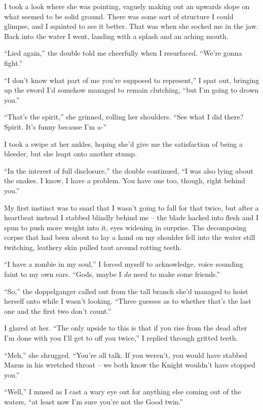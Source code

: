 \documentclass[12pt, openany]{book}
\begin{document}
I took a look where she was pointing, vaguely making out an upwards slope on what seemed to be solid ground. There was some sort of structure I could glimpse, and I squinted to see it better. That was when she socked me in the jaw. Back into the water I went, landing with a splash and an aching mouth.

“Lied again,” the double told me cheerfully when I resurfaced. “We’re gonna fight.”

“I don’t know what part of me you’re supposed to represent,” I spat out, bringing up the sword I’d somehow managed to remain clutching, “but I’m going to drown you.”

“That’s the spirit,” she grinned, rolling her shoulders. “See what I did there? Spirit. It’s funny because I’m a-”

I took a swipe at her ankles, hoping she’d give me the satisfaction of being a bleeder, but she leapt onto another stump.

“In the interest of full disclosure,” the double continued, “I was also lying about the snakes. I know, I have a problem. You have one too, though, right behind you.”

My first instinct was to snarl that I wasn’t going to fall for that twice, but after a heartbeat instead I stabbed blindly behind me – the blade hacked into flesh and I spun to push more weight into it, eyes widening in surprise. The decomposing corpse that had been about to lay a hand on my shoulder fell into the water still twitching, leathery skin pulled taut around rotting teeth.

“I have a zombie in my soul,” I forced myself to acknowledge, voice sounding faint to my own ears. “Gods, maybe I \textit{do} need to make some friends.”

“So,” the doppelganger called out from the tall branch she’d managed to hoist herself onto while I wasn’t looking. “Three guesses as to whether that’s the last one and the first two don’t count.”

I glared at her. “The only upside to this is that if you rise from the dead after I’m done with you I’ll get to off you twice,” I replied through gritted teeth.

“Meh,” she shrugged. “You’re all talk. If you weren’t, you would have stabbed Mazus in his wretched throat – we both know the Knight wouldn’t have stopped you.”

“Well,” I mused as I cast a wary eye out for anything else coming out of the waters, “at least now I’m sure you’re not the Good twin.”
\end{document}

